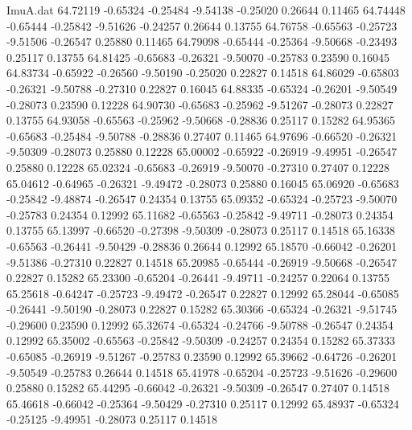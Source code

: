 \begin{filecontents}{ImuA.dat}
  64.72119   -0.65324   -0.25484   -9.54138   -0.25020    0.26644    0.11465
  64.74448   -0.65444   -0.25842   -9.51626   -0.24257    0.26644    0.13755
  64.76758   -0.65563   -0.25723   -9.51506   -0.26547    0.25880    0.11465
  64.79098   -0.65444   -0.25364   -9.50668   -0.23493    0.25117    0.13755
  64.81425   -0.65683   -0.26321   -9.50070   -0.25783    0.23590    0.16045
  64.83734   -0.65922   -0.26560   -9.50190   -0.25020    0.22827    0.14518
  64.86029   -0.65803   -0.26321   -9.50788   -0.27310    0.22827    0.16045
  64.88335   -0.65324   -0.26201   -9.50549   -0.28073    0.23590    0.12228
  64.90730   -0.65683   -0.25962   -9.51267   -0.28073    0.22827    0.13755
  64.93058   -0.65563   -0.25962   -9.50668   -0.28836    0.25117    0.15282
  64.95365   -0.65683   -0.25484   -9.50788   -0.28836    0.27407    0.11465
  64.97696   -0.66520   -0.26321   -9.50309   -0.28073    0.25880    0.12228
  65.00002   -0.65922   -0.26919   -9.49951   -0.26547    0.25880    0.12228
  65.02324   -0.65683   -0.26919   -9.50070   -0.27310    0.27407    0.12228
  65.04612   -0.64965   -0.26321   -9.49472   -0.28073    0.25880    0.16045
  65.06920   -0.65683   -0.25842   -9.48874   -0.26547    0.24354    0.13755
  65.09352   -0.65324   -0.25723   -9.50070   -0.25783    0.24354    0.12992
  65.11682   -0.65563   -0.25842   -9.49711   -0.28073    0.24354    0.13755
  65.13997   -0.66520   -0.27398   -9.50309   -0.28073    0.25117    0.14518
  65.16338   -0.65563   -0.26441   -9.50429   -0.28836    0.26644    0.12992
  65.18570   -0.66042   -0.26201   -9.51386   -0.27310    0.22827    0.14518
  65.20985   -0.65444   -0.26919   -9.50668   -0.26547    0.22827    0.15282
  65.23300   -0.65204   -0.26441   -9.49711   -0.24257    0.22064    0.13755
  65.25618   -0.64247   -0.25723   -9.49472   -0.26547    0.22827    0.12992
  65.28044   -0.65085   -0.26441   -9.50190   -0.28073    0.22827    0.15282
  65.30366   -0.65324   -0.26321   -9.51745   -0.29600    0.23590    0.12992
  65.32674   -0.65324   -0.24766   -9.50788   -0.26547    0.24354    0.12992
  65.35002   -0.65563   -0.25842   -9.50309   -0.24257    0.24354    0.15282
  65.37333   -0.65085   -0.26919   -9.51267   -0.25783    0.23590    0.12992
  65.39662   -0.64726   -0.26201   -9.50549   -0.25783    0.26644    0.14518
  65.41978   -0.65204   -0.25723   -9.51626   -0.29600    0.25880    0.15282
  65.44295   -0.66042   -0.26321   -9.50309   -0.26547    0.27407    0.14518
  65.46618   -0.66042   -0.25364   -9.50429   -0.27310    0.25117    0.12992
  65.48937   -0.65324   -0.25125   -9.49951   -0.28073    0.25117    0.14518

\end{filecontents}
